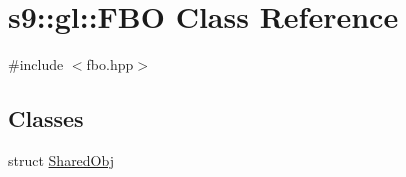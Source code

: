 \hypertarget{classs9_1_1gl_1_1FBO}{\section{s9\-:\-:gl\-:\-:\-F\-B\-O \-Class \-Reference}
\label{classs9_1_1gl_1_1FBO}
}


{\ttfamily \#include $<$fbo.\-hpp$>$}

\subsection*{\-Classes}
\begin{DoxyCompactItemize}
\item 
struct \hyperlink{structs9_1_1gl_1_1FBO_1_1SharedObj}{\-Shared\-Obj}
\end{DoxyCompactItemize}
